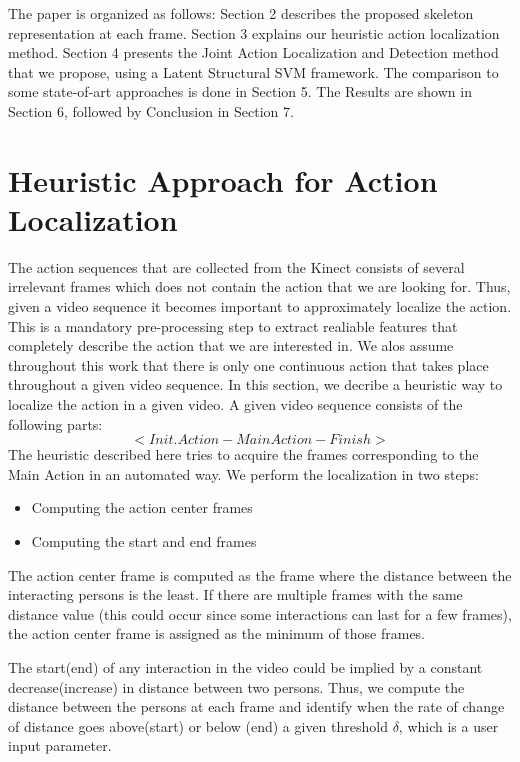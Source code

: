 \documentclass[10pt,twocolumn,letterpaper]{article}
\begin{document}
The paper is organized as follows: Section 2 describes the proposed skeleton representation at each frame. Section 3 explains our heuristic action localization method. Section 4 presents the Joint Action Localization and Detection method that we propose, using a Latent Structural SVM framework. The comparison to some state-of-art approaches is done in Section 5. The Results are shown in Section 6, followed by Conclusion in Section 7.


\section{Heuristic Approach for Action Localization}\label{sec:actionlocalization}

The action sequences that are collected from the Kinect consists of several irrelevant frames which does not contain the action that we are looking for. Thus, given a video sequence it becomes important to approximately localize the action. This is a mandatory pre-processing step to extract realiable features that completely describe the action that  we are interested in. We alos assume throughout this work that there is only one continuous action that takes place throughout a given video sequence. In this section, we decribe a heuristic way to localize the action in a given video. A given video sequence consists of the following parts:
\begin{equation}
<Init. Action - Main Action - Finish>
\end{equation}
The heuristic described here tries to acquire the frames corresponding to the Main Action  in an automated way. We perform the localization in two steps:
\begin{itemize}
\item Computing the action center frames
\item Computing the start and end frames
\end{itemize}

The action center frame is computed as the frame where the distance between the interacting persons is the least. If there are multiple frames with the same distance value (this could occur since some interactions can last for a few frames), the action center frame is assigned as the minimum of those frames.

The start(end) of any interaction in the video could be implied by a constant decrease(increase) in distance between two persons. Thus, we compute the distance between the persons at each frame and identify when the rate of change of distance goes above(start) or below (end) a given threshold $\delta$, which is a user input parameter. 
\end{document}
